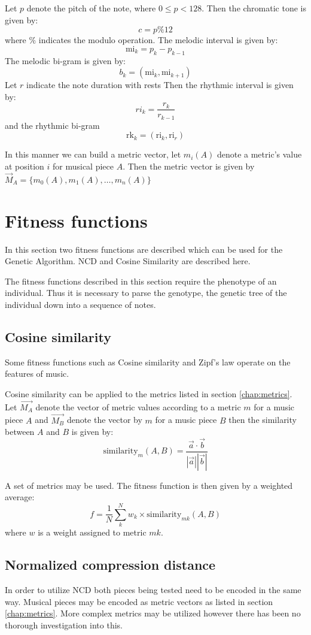 Let $p$ denote the pitch of the note, where $0 \leq p < 128$.
Then the chromatic tone is given by:
\[c = p \% 12\]
where $\%$ indicates the modulo operation.
The melodic interval is given by:
\[\text{mi}_k = p_k - p_{k-1} \]
The melodic bi-gram is given by:
\[b_k = (\text{mi}_k, \text{mi}_{k+1}) \]
Let $r$ indicate the note duration with rests
Then the rhythmic interval is given by:
\[\text{}ri_k = \frac{r_k}{r_{k-1}} \]
and the rhythmic bi-gram
\[\text{rk}_k = (\text{ri}_k, \text{ri}_r) \]

In this manner we can build a metric vector, let $m_i(A)$ denote a metric's value at position $i$ for musical piece $A$. Then the metric vector is given by $\vec{M}_A = \{m_0(A), m_1(A), \ldots, m_n(A) \}$ 


\section{Fitness functions}

In this section two fitness functions are described which can be used for the Genetic Algorithm. \ac{NCD} and Cosine Similarity are described here.

The fitness functions described in this section require the phenotype of an individual. Thus it is necessary to parse the genotype, the genetic tree of the individual down into a sequence of notes.

\subsection{Cosine similarity}
Some fitness functions such as Cosine similarity and Zipf's law operate on the features of music. 

Cosine similarity can be applied to the metrics listed in section \ref{chap:metrics}. Let $\vec{M_A}$ denote the vector of metric values according to a metric $m$ for a music piece $A$ and $\vec{M_B}$ denote the vector by $m$ for a music piece $B$ then the similarity between $A$ and $B$ is given by:
\[\text{similarity}_m(A,B) = \frac{\vec{a} \cdot \vec{b}}{|\vec{a}| |\vec{b}|}\]

A set of metrics may be used. 
The fitness function is then given by a weighted average:
\[f = \frac{1}{N} \sum_{k}^N w_k \times \text{similarity}_{mk}(A,B) \]
where $w$ is a weight assigned to metric $mk$.

\subsection{Normalized compression distance}
In order to utilize \ac{NCD} both pieces being tested need to be encoded in the same way. Musical pieces may be encoded as metric vectors as listed in section \ref{chap:metrics}. More complex metrics may be utilized however there has been no thorough investigation into this.

